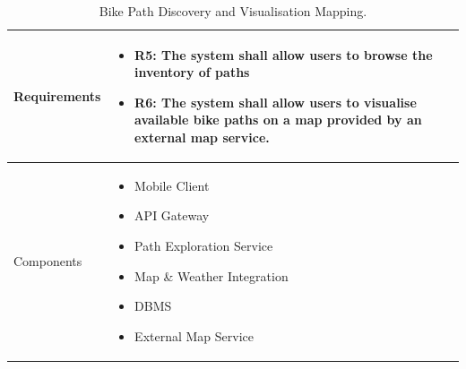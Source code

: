 \begin{table}[H]
    \centering
    \renewcommand{\arraystretch}{1.3}
    \begin{tabular}{|p{}|p{}|}
        \hline
        Requirements & \begin{itemize}[topsep=0pt, partopsep=0pt, leftmargin=*] 
            \item R5: The system shall allow users to browse the inventory of paths
            \item R6: The system shall allow users to visualise available bike paths on a map provided by an external map service.
        \end{itemize} \\
        \hline
        Components & \begin{itemize}[topsep=0pt, partopsep=0pt, leftmargin=*] 
            \item Mobile Client
            \item API Gateway
            \item Path Exploration Service
            \item Map \& Weather Integration
            \item DBMS
            \item External Map Service
        \end{itemize} \\
        \hline
    \end{tabular}
    \caption{Bike Path Discovery and Visualisation Mapping.}
    \label{tab:explore_mapping}
\end{table}

